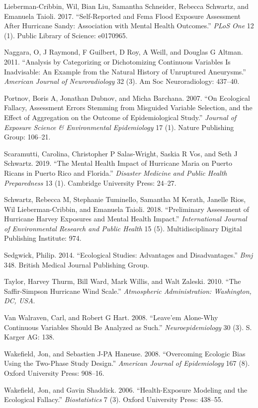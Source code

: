 \documentclass[]{article}
\begin{document}
\hypertarget{ref-lieberman2017self}{}
Lieberman-Cribbin, Wil, Bian Liu, Samantha Schneider, Rebecca Schwartz,
and Emanuela Taioli. 2017. ``Self-Reported and Fema Flood Exposure
Assessment After Hurricane Sandy: Association with Mental Health
Outcomes.'' \emph{PLoS One} 12 (1). Public Library of Science: e0170965.

\hypertarget{ref-naggara2011analysis}{}
Naggara, O, J Raymond, F Guilbert, D Roy, A Weill, and Douglas G Altman.
2011. ``Analysis by Categorizing or Dichotomizing Continuous Variables
Is Inadvisable: An Example from the Natural History of Unruptured
Aneurysms.'' \emph{American Journal of Neuroradiology} 32 (3). Am Soc
Neuroradiology: 437--40.

\hypertarget{ref-portnov2007ecological}{}
Portnov, Boris A, Jonathan Dubnov, and Micha Barchana. 2007. ``On
Ecological Fallacy, Assessment Errors Stemming from Misguided Variable
Selection, and the Effect of Aggregation on the Outcome of
Epidemiological Study.'' \emph{Journal of Exposure Science \&
Environmental Epidemiology} 17 (1). Nature Publishing Group: 106--21.

\hypertarget{ref-scaramutti2019mental}{}
Scaramutti, Carolina, Christopher P Salas-Wright, Saskia R Vos, and Seth
J Schwartz. 2019. ``The Mental Health Impact of Hurricane Maria on
Puerto Ricans in Puerto Rico and Florida.'' \emph{Disaster Medicine and
Public Health Preparedness} 13 (1). Cambridge University Press: 24--27.

\hypertarget{ref-schwartz2018preliminary}{}
Schwartz, Rebecca M, Stephanie Tuminello, Samantha M Kerath, Janelle
Rios, Wil Lieberman-Cribbin, and Emanuela Taioli. 2018. ``Preliminary
Assessment of Hurricane Harvey Exposures and Mental Health Impact.''
\emph{International Journal of Environmental Research and Public Health}
15 (5). Multidisciplinary Digital Publishing Institute: 974.

\hypertarget{ref-sedgwick2014ecological}{}
Sedgwick, Philip. 2014. ``Ecological Studies: Advantages and
Disadvantages.'' \emph{Bmj} 348. British Medical Journal Publishing
Group.

\hypertarget{ref-taylor2010saffir}{}
Taylor, Harvey Thurm, Bill Ward, Mark Willis, and Walt Zaleski. 2010.
``The Saffir-Simpson Hurricane Wind Scale.'' \emph{Atmospheric
Administration: Washington, DC, USA}.

\hypertarget{ref-van2008leave}{}
Van Walraven, Carl, and Robert G Hart. 2008. ``Leave'em Alone-Why
Continuous Variables Should Be Analyzed as Such.''
\emph{Neuroepidemiology} 30 (3). S. Karger AG: 138.

\hypertarget{ref-wakefield2008overcoming}{}
Wakefield, Jon, and Sebastien J-PA Haneuse. 2008. ``Overcoming Ecologic
Bias Using the Two-Phase Study Design.'' \emph{American Journal of
Epidemiology} 167 (8). Oxford University Press: 908--16.

\hypertarget{ref-wakefield2006health}{}
Wakefield, Jon, and Gavin Shaddick. 2006. ``Health-Exposure Modeling and
the Ecological Fallacy.'' \emph{Biostatistics} 7 (3). Oxford University
Press: 438--55.
\end{document}
